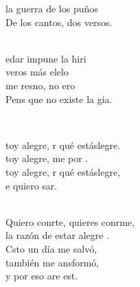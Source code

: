 \documentclass[12pt]{article}
\begin{document}
\begin{multicols*}{2}
\begin{cancion}
	 la guerra de los puños \\
	De los cantos, dos versos.\\\jump\\
	\begin{chorus}%
	edar impune la hiri\\
	 veros más elelo\\
	 me resno, no ero \\
	Pens que no existe la gia. \\
	\end{chorus}%
	\jump\\
\end{cancion}%

\begin{cancion}%
	\begin{chorus}%
	toy alegre, r qué estáslegre.\\
	toy alegre, me por . \\
	toy alegre, r qué estáslegre,\\
	e quiero sar.\\
	\end{chorus}%
	\jump\\
	Quiero conrte, quieres conrme,\\
	la razón de estar alegre . \\
\jump
	Csto un día me salvó,\\
	también me ansformó,\\
	y por eso are est.\\
\end{cancion}%


\end{multicols*}
\end{document}
